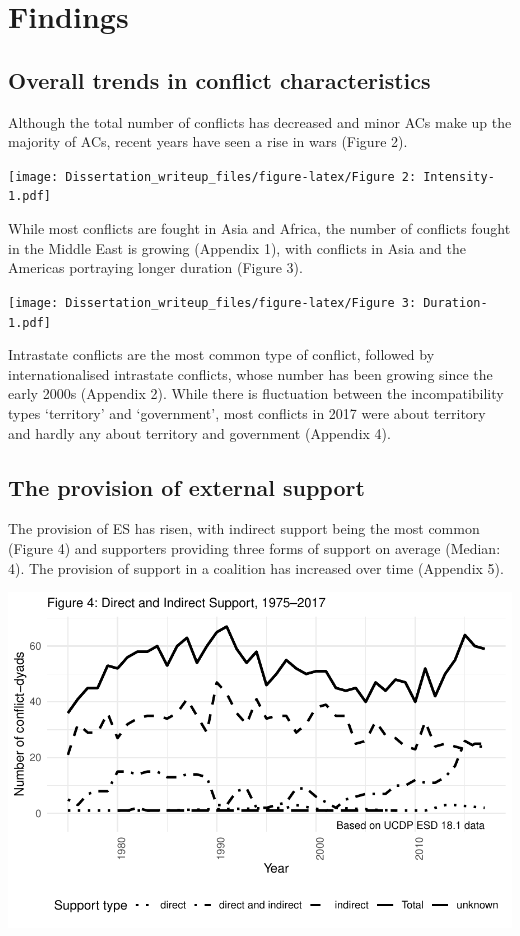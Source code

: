 \documentclass[
]{article}
\begin{document}
\section{Findings}\label{findings}

\subsection{Overall trends in conflict
characteristics}\label{overall-trends-in-conflict-characteristics}

Although the total number of conflicts has decreased and minor ACs make
up the majority of ACs, recent years have seen a rise in wars (Figure
2).

\texttt{[image: Dissertation\_writeup\_files/figure-latex/Figure 2: Intensity-1.pdf]}

While most conflicts are fought in Asia and Africa, the number of
conflicts fought in the Middle East is growing (Appendix 1), with
conflicts in Asia and the Americas portraying longer duration (Figure
3).

\texttt{[image: Dissertation\_writeup\_files/figure-latex/Figure 3: Duration-1.pdf]}

Intrastate conflicts are the most common type of conflict, followed by
internationalised intrastate conflicts, whose number has been growing
since the early 2000s (Appendix 2). While there is fluctuation between
the incompatibility types `territory' and `government', most conflicts
in 2017 were about territory and hardly any about territory and
government (Appendix 4).

\subsection{The provision of external
support}\label{the-provision-of-external-support}

The provision of ES has risen, with indirect support being the most
common (Figure 4) and supporters providing three forms of support on
average (Median: 4). The provision of support in a coalition has
increased over time (Appendix 5).

\includegraphics{Dissertation_writeup_files/figure-latex/Figure 4 (In-)direct support-1.pdf}
\end{document}
